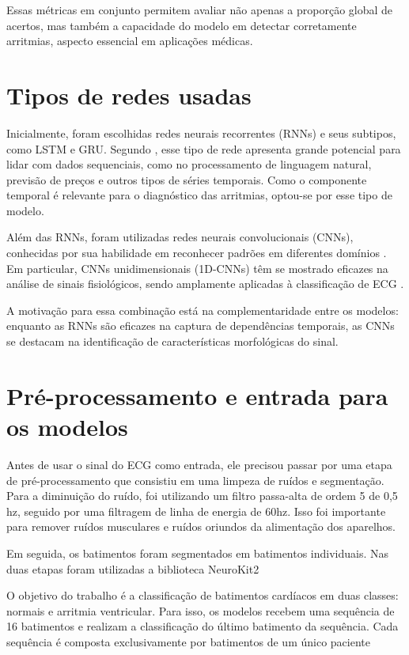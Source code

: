 \documentclass[
    12pt,                %
    openright,           %
    oneside,             %
    a4paper,             %
    brazil               %
]{abntex2}
\begin{document}
Essas métricas em conjunto permitem avaliar não apenas a proporção global de acertos, mas também a capacidade do modelo em detectar corretamente arritmias, aspecto essencial em aplicações médicas.

\section{Tipos de redes usadas}
\label{sec:tipo_redes}

Inicialmente, foram escolhidas redes neurais recorrentes (RNNs) e seus subtipos, como LSTM e GRU. Segundo , esse tipo de rede apresenta grande potencial para lidar com dados sequenciais, como no processamento de linguagem natural, previsão de preços e outros tipos de séries temporais. Como o componente temporal é relevante para o diagnóstico das arritmias, optou-se por esse tipo de modelo.

Além das RNNs, foram utilizadas redes neurais convolucionais (CNNs), conhecidas por sua habilidade em reconhecer padrões em diferentes domínios . Em particular, CNNs unidimensionais (1D-CNNs) têm se mostrado eficazes na análise de sinais fisiológicos, sendo amplamente aplicadas à classificação de ECG \cite{narotamo2024}.

A motivação para essa combinação está na complementaridade entre os modelos: enquanto as RNNs são eficazes na captura de dependências temporais, as CNNs se destacam na identificação de características morfológicas do sinal.

\section{Pré-processamento e entrada para os modelos}
\label{sec:pre_process}

Antes de usar o sinal do ECG como entrada, ele precisou passar por uma etapa de pré-processamento que consistiu em uma limpeza de ruídos e segmentação.
Para a diminuição do ruído, foi utilizando um filtro passa-alta de ordem 5 de 0,5 hz, seguido por uma filtragem de linha de energia de 60hz. 
Isso foi importante para remover ruídos musculares e ruídos oriundos da alimentação dos aparelhos. 

Em seguida, os batimentos foram segmentados em batimentos individuais. Nas duas etapas foram utilizadas a biblioteca NeuroKit2 \cite{Makowski2021neurokit}

O objetivo do trabalho é a classificação de batimentos cardíacos em duas classes: normais e arritmia ventricular. 
Para isso, os modelos recebem uma sequência de 16 batimentos e realizam a classificação do último batimento da sequência. 
Cada sequência é composta exclusivamente por batimentos de um único paciente
\end{document}
